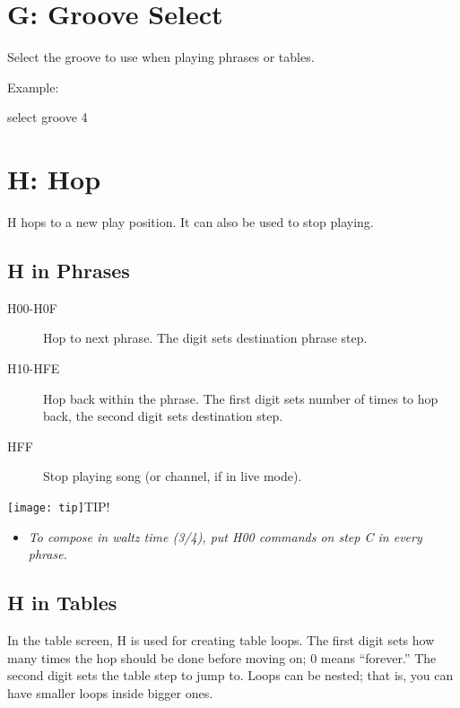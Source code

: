 \section{G: Groove Select}

Select the groove to use when playing phrases or tables.

\begin{description}
\item Example:
\item[G04] select groove 4
\end{description}

\section{H: Hop}

H hops to a new play position. It can also be used to stop playing.

\subsection{H in Phrases}

\begin{description}
    \item[H00-H0F] Hop to next phrase. The digit sets destination phrase step.
    \item[H10-HFE] Hop back within the phrase. The first digit sets number of times to hop back, the second digit sets destination step.
    \item[HFF] Stop playing song (or channel, if in live mode).
\end{description}

\texttt{[image: tip]}TIP!
\nolinebreak
\begin{itemize}
        \item \textit{To compose in waltz time (3/4), put \textsc{H00} commands on step \textsc{C} in every phrase.}
\end{itemize}

\subsection{H in Tables}

In the table screen, H is used for creating table loops. The first digit sets how many times the hop should be done before moving on; 0 means ``forever.'' The second digit sets the table step to jump to. Loops can be nested; that is, you can have smaller loops inside bigger ones.

